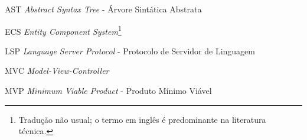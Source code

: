 \begin{siglas}
	\item[AST] \textit{Abstract Syntax Tree} - Árvore Sintática Abstrata
	\item[ECS] \textit{Entity Component System}\footnote{Tradução não usual; o termo em inglês é predominante na literatura técnica.}
	\item[LSP] \textit{Language Server Protocol} - Protocolo de Servidor de Linguagem
	\item[MVC] \textit{Model-View-Controller}\footnotemark[1]
	\item[MVP] \textit{Minimum Viable Product} - Produto Mínimo Viável
\end{siglas}
